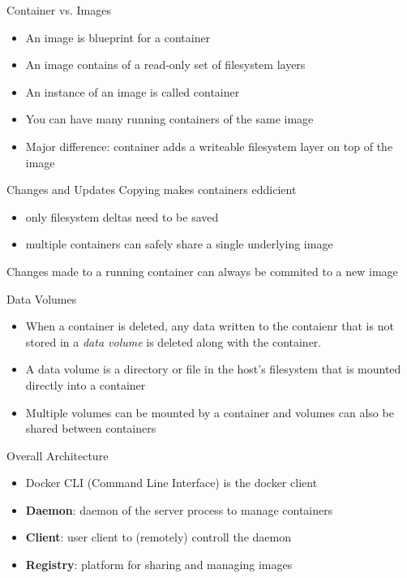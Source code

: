 \documentclass[10pt,aspectratio=\ratio,
compress
]{beamer}
\begin{document}
\begin{frame}{Container vs. Images}
\begin{itemize}
	\item An image is blueprint for a container
	\item An image contains of a read-only set of filesystem layers
	\item An instance of an image is called container
	\item You can have many running containers of the same image
	\item Major difference: container adds a writeable filesystem layer on top of the image
\end{itemize}

\end{frame}
\begin{frame}{Changes and Updates}
Copying makes containers eddicient
\begin{itemize}
	\item only filesystem deltas need to be saved
	\item multiple containers can safely share a single underlying image
\end{itemize}
Changes made to a running container can always be commited to a new image
\end{frame}
\begin{frame}{Data Volumes}
\begin{itemize}
\item When a container is deleted, any data written to the contaienr that is not stored in a \emph{data volume} is deleted along with the container.
\item A data volume is a directory or file in the host's filesystem that is mounted directly into a container
\item Multiple volumes can be mounted by a container and volumes can also be shared between containers
\end{itemize}
\end{frame}
\begin{frame}{Overall Architecture}
\begin{itemize}
	\item Docker CLI (Command Line Interface) is the docker client
\end{itemize}
\begin{itemize}
	\item \textbf{Daemon}: daemon of the server process to manage containers
	\item \textbf{Client}: user client to (remotely) controll the daemon
	\item \textbf{Registry}: platform for sharing and managing images
\end{itemize}
\end{frame}
\end{document}
